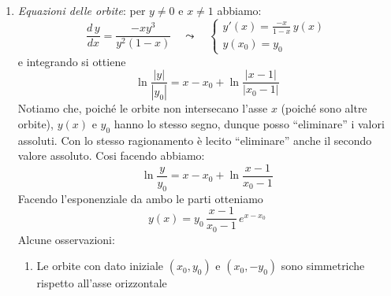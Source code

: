 {\begin{enumerate}
    Se $ x=0 $ abbiamo \[
        \begin{cases}
            x'=y^{2}>0\\ 
            y'=0
        \end{cases}
    \]
    \begin{figure}[H]
        \begin{center}
        \end{center}
        \caption{Punti con tangenti verticali e orizzontali per l'esempio }
    \end{figure}
    \item \emph{Equazioni delle orbite}: per $ y\neq 0 $ e $ x\neq 1 $ abbiamo: \begin{equation}
        \frac{d\,y}{dx} =\frac{-xy^{3}}{y^{2}(1-x)}\quad\leadsto\quad \begin{cases}
            y'(x)=\displaystyle\frac{-x}{1-x}\,y(x) \label{eq:diff:orb}\\ 
            y(x_0)=y_0
        \end{cases}
    \end{equation}e integrando si ottiene \[
        \ln\frac{|y|}{|y_0|} = x-x_0 + \ln\frac{|x-1|}{|x_0-1|}
    \]Notiamo che, poiché le orbite non intersecano l'asse $ x $ (poiché sono altre orbite), $ y(x) $ e $ y_0 $ hanno lo stesso segno, dunque posso ``eliminare'' i valori assoluti. Con lo stesso ragionamento è lecito ``eliminare'' anche il secondo valore assoluto. Cosi facendo abbiamo: \[
        \ln\frac{y}{y_0} = x-x_0 + \ln\frac{x-1}{x_0-1}
    \]Facendo l'esponenziale da ambo le parti otteniamo \[
        y(x)= y_0\,\frac{x-1}{x_0-1}\,e^{x-x_0}
    \]Alcune osservazioni: \begin{enumerate}
        \item Le orbite con dato iniziale $ (x_0,y_0) $ e $ (x_0,-y_0) $ sono simmetriche rispetto all'asse orizzontale 
        

\end{enumerate}
\end{enumerate}}

